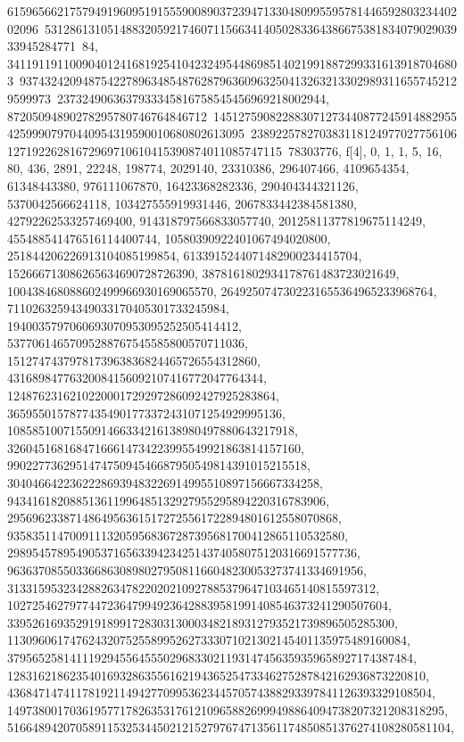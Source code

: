 {{{61596566217579491960951915559008903723947133048099559578144659280323440202096\
53128613105148832059217460711566341405028336438667538183407902903933945284771\
84, 3411911911009040124168192541042324954486985140219918872993316139187046803\
93743242094875422789634854876287963609632504132632133029893116557452129599973\
2373249063637933345816758545456969218002944, 87205094890278295780746764846712\
14512759082288307127344087724591488295542599907970440954319590010680802613095\
23892257827038311812497702775610612719226281672969710610415390874011085747115\
78303776}}, {f[4], {0, 1, 1, 5, 16, 80, 436, 2891, 22248, 198774, 2029140, 
   23310386, 296407466, 4109654354, 61348443380, 976111067870, 
   16423368282336, 290404344321126, 5370042566624118, 103427555919931446, 
   2067833442384581380, 42792262533257469400, 914318797566833057740, 
   20125811377819675114249, 455488541476516114400744, 
   10580390922401067494020800, 251844206226913104085199854, 
   6133915244071482900234415704, 152666713086265634690728726390, 
   3878161802934178761483723021649, 100438468088602499966930169065570, 
   2649250747302231655364965233968764, 71102632594349033170405301733245984, 
   1940035797060693070953095252505414412, 
   53770614657095288767545585800570711036, 
   1512747437978173963836824465726554312860, 
   43168984776320084156092107416772047764344, 
   1248762316210220001729297286092427925283864, 
   36595501578774354901773372431071254929995136, 
   1085851007155091466334216138980497880643217918, 
   32604516816847166614734223995549921863814157160, 
   990227736295147475094546687950549814391015215518, 
   30404664223622286939483226914995510897156667334258, 
   943416182088513611996485132927955295894220316783906, 
   29569623387148649563615172725561722894801612558070868, 
   935835114700911132059568367287395681700412865110532580, 
   29895457895490537165633942342514374058075120316691577736, 
   963637085503366863089802795081166048230053273741334691956, 
   31331595323428826347822020210927885379647103465140815597312, 
   1027254627977447236479949236428839581991408546373241290507604, 
   33952616935291918991728303130003482189312793521739896505285300, 
   1130960617476243207525589952627333071021302145401135975489160084, 
   37956525814111929455645550296833021193147456359359658927174387484, 
   1283162186235401693286355616219436525473346275287842162936873220810, 
   43684714741178192114942770995362344570574388293397841126393329108504, 
   1497380017036195771782635317612109658826999498864094738207321208318295, 
   51664894207058911532534450212152797674713561174850851376274108280581104, 
}}}
